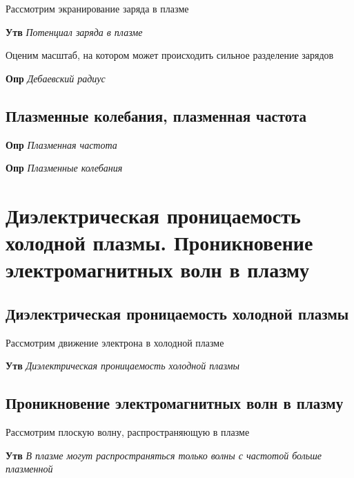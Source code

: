 \documentclass[a4paper, 14pt]{article}
\begin{document}
    Рассмотрим экранирование заряда в плазме
    
    \textbf{Утв} \textit{Потенциал заряда в плазме}
    
    Оценим масштаб, на котором может происходить сильное разделение зарядов
    
    \textbf{Опр} \textit{Дебаевский радиус}
    
    \subsection{Плазменные колебания, плазменная частота}
    
    \textbf{Опр} \textit{Плазменная частота}
    
    \textbf{Опр} \textit{Плазменные колебания}
    
    \section{Диэлектрическая проницаемость холодной плазмы.
    Проникновение электромагнитных волн в плазму}
    
    \subsection{Диэлектрическая проницаемость холодной плазмы}
    
    Рассмотрим движение электрона в холодной плазме
    
    \textbf{Утв} \textit{Диэлектрическая проницаемость холодной плазмы}
    
    \subsection{Проникновение электромагнитных волн в плазму}
    
    Рассмотрим плоскую волну, распространяющую в плазме
    
    \textbf{Утв} \textit{В плазме могут распространяться только волны с частотой больше плазменной}
\end{document}
